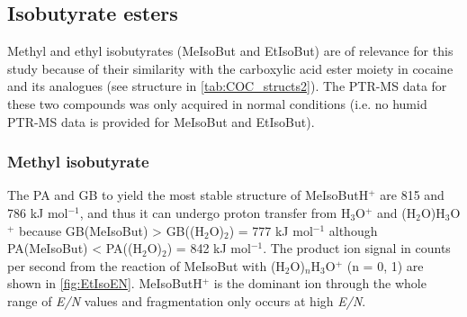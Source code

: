 



\subsection{Isobutyrate esters}
Methyl and ethyl isobutyrates (MeIsoBut and EtIsoBut) are of relevance for this study because of their similarity with the carboxylic acid ester moiety in cocaine and its analogues (see structure in \autoref{tab:COC_structs2}).
%
The PTR-MS data for these two compounds was only acquired in normal conditions (i.e. no humid PTR-MS data is provided for MeIsoBut and EtIsoBut).


\subsubsection{Methyl isobutyrate}

The PA and GB to yield the most stable structure of MeIsoButH$^+$ are 815 and 786 kJ mol$^{-1}$, and thus it can undergo proton transfer from H$_3$O$^+$ and (H$_2$O)H$_3$O$^+$ 
because GB(MeIsoBut) > GB((H$_2$O)$_2$) = 777 kJ mol$^{-1}$ although 
PA(MeIsoBut) < PA((H$_2$O)$_2$) = 842 kJ mol$^{-1}$.
%
The product ion signal in counts per second from the reaction of MeIsoBut with (H$_2$O)$_n$H$_3$O$^+$ (n = 0, 1) are shown in \autoref{fig:EtIsoEN}. 
%
MeIsoButH$^+$ is the dominant ion through the whole range of \textit{E/N} values and fragmentation only occurs at high \textit{E/N}.
%


